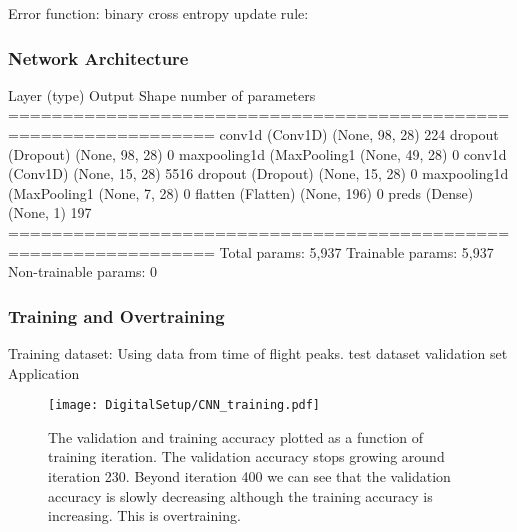 \documentclass[main.tex]{subfiles}
\begin{document}
Error function: binary cross entropy
update rule: 

\subsubsection{Network Architecture}
Layer (type)                 Output Shape              number of parameters   
\newline =================================================================
\newline conv1d (Conv1D)            (None, 98, 28)            224       
\newline dropout (Dropout)          (None, 98, 28)            0         
\newline maxpooling1d (MaxPooling1 (None, 49, 28)            0         
\newline conv1d (Conv1D)            (None, 15, 28)            5516      
\newline dropout (Dropout)          (None, 15, 28)            0         
\newline maxpooling1d (MaxPooling1 (None, 7, 28)             0         
\newline flatten (Flatten)          (None, 196)               0         
\newline preds (Dense)                (None, 1)                 197       
\newline =================================================================
\newline Total params: 5,937
\newline Trainable params: 5,937
\newline Non-trainable params: 0

\subsubsection{Training and Overtraining}
Training dataset: Using data from time of flight peaks.
\newline test dataset
\newline validation set
\newline Application

\label{sec:cnn}
\begin{figure}[ht!]
    \centering
        \texttt{[image: DigitalSetup/CNN\_training.pdf]}
        \caption{The validation and training accuracy plotted as a function of training iteration. The validation accuracy stops growing around iteration 230. Beyond iteration 400 we can see that the validation accuracy is slowly decreasing although the training accuracy is increasing. This is overtraining.}
    \label{fig:CNN_training} 
\end{figure}
\end{document}
